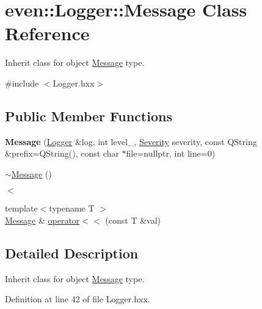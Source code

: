 \hypertarget{classeven_1_1_logger_1_1_message}{}\section{even\+:\+:Logger\+:\+:Message Class Reference}
\label{classeven_1_1_logger_1_1_message}


Inherit class for object \mbox{\hyperlink{classeven_1_1_logger_1_1_message}{Message}} type.  




{\ttfamily \#include $<$Logger.\+hxx$>$}

\subsection*{Public Member Functions}
\begin{DoxyCompactItemize}
\item 
\mbox{\label{classeven_1_1_logger_1_1_message_aea47ae5a4216f206d5f560c57503f70f}} 
{\bfseries Message} (\mbox{\hyperlink{classeven_1_1_logger}{Logger}} \&log, int level\+\_\+, \mbox{\hyperlink{classeven_1_1_logger_adac430b7650d87ac25ace824917d66cf}{Severity}} severity, const Q\+String \&prefix=Q\+String(), const char $\ast$file=nullptr, int line=0)
\item 
\mbox{\hyperlink{classeven_1_1_logger_1_1_message_ad870fdc45b86b6621da4c21ca4ab30da}{$\sim$\+Message}} ()
\begin{DoxyCompactList}\small\item\em $<$ \end{DoxyCompactList}\item 
{\footnotesize template$<$typename T $>$ }\\\mbox{\hyperlink{classeven_1_1_logger_1_1_message}{Message}} \& \mbox{\hyperlink{classeven_1_1_logger_1_1_message_ae75067bf8787b3ebd7dea6b313e3a958}{operator$<$$<$}} (const T \&val)
\end{DoxyCompactItemize}


\subsection{Detailed Description}
Inherit class for object \mbox{\hyperlink{classeven_1_1_logger_1_1_message}{Message}} type. 

Definition at line 42 of file Logger.\+hxx.



